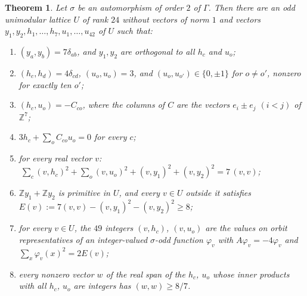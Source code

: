 \documentclass[11pt]{amsart}
\newtheorem{theorem}{Theorem}[section]
\theoremstyle{definition}
\theoremstyle{remark}
\newcommand{\Z}{\mathbb{Z}}
\newcommand{\G}{\Gamma}
\newcommand{\s}{\sigma}
\begin{document}
\begin{theorem}\label{thm:R}
Let $\s$ be an automorphism of order $2$ of $\G$. Then there are an odd unimodular lattice $U$ of rank $24$ without vectors of
norm $1$ and vectors $y_1,y_2,h_1,\dots,h_7,u_1,\dots,u_{42}$ of $U$ such that:
\begin{enumerate}[label=\textup{(R\arabic*)},leftmargin=3.2em]
\item $(y_a,y_b)=7\delta_{ab}$, and $y_1,y_2$ are orthogonal to all $h_c$ and $u_o$;
\item $(h_c,h_d)=4\delta_{cd}$, $(u_o,u_o)=3$, and $(u_o,u_{o'})\in\{0,\pm1\}$ for $o\ne o'$, nonzero for exactly ten $o'$;
\item $(h_c,u_o)=-C_{co}$, where the columns of $C$ are the vectors $e_i\pm e_j$ $(i<j)$ of $\Z^7$;
\item $3h_c+\sum_oC_{co}u_o=0$ for every $c$;
\item for every real vector $v$: $\ \sum_c(v,h_c)^2+\sum_o(v,u_o)^2+(v,y_1)^2+(v,y_2)^2=7\,(v,v)$;
\item $\Z y_1+\Z y_2$ is primitive in $U$, and every $v\in U$ outside it satisfies
$E(v):=7(v,v)-(v,y_1)^2-(v,y_2)^2\ge 8$;
\item for every $v\in U$, the $49$ integers $(v,h_c)$, $(v,u_o)$ are the values on orbit representatives of an
integer-valued $\s$-odd function $\varphi_v$ with $A\varphi_v=-4\varphi_v$ and $\sum_x\varphi_v(x)^2=2E(v)$;
\item every nonzero vector $w$ of the real span of the $h_c$, $u_o$ whose inner products with all $h_c$, $u_o$ are integers
has $(w,w)\ge 8/7$.
\end{enumerate}
\end{theorem}
\end{document}
